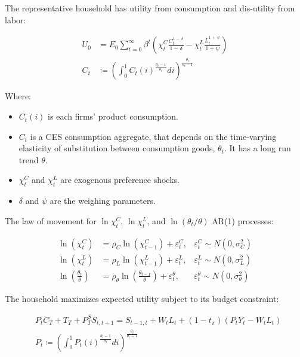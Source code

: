 \documentclass[12pt]{article}
\begin{document}
The representative household has utility from consumption and dis-utility from labor:

\begin{align*}
    U_{0} &=E_{0}\sum_{t=0}^{\infty}\beta^{t}\left(\chi_{t}^{C}\frac{C_{t}^{1\,-\,\delta}}{1-\delta}-\chi_{t}^{L}\frac{L_{t}^{1\,+\,\psi}}{1+\psi}\right)\\
    C_t &\coloneqq \left(\int_0^1C_t(i)^{\frac{\theta_t - 1}{\theta_t}} di\right)^{\frac{\theta_t}{\theta_t - 1}}
\end{align*}

Where:

\begin{itemize}
    \item $C_t(i)$ is each firms' product consumption.
    \item $C_t$ is a CES consumption aggregate, that depends on the time-varying elasticity of substitution between consumption goods, $\theta_t$. It has a long run trend $\theta$.
    \item $\chi_t^C$ and $\chi_t^L$ are exogenous preference shocks.
    \item $\delta$ and $\psi$ are the weighing parameters.
\end{itemize}

The law of movement for $\ln\chi_t^C$, $\ln\chi_t^L$, and $\ln(\theta_t/\theta)$ AR(1) processes:

\begin{align*}
    \ln(\chi_{t}^{C}) &=\rho_{C}\ln(\chi_{t-1}^{C})+\varepsilon_{t}^{C}, &\varepsilon_{t}^{C} \sim N(0, \sigma^2_C) \tag{1}\\
    \ln(\chi_{t}^{L}) &=\rho_{L}\ln(\chi_{t-1}^{L})+\varepsilon_{t}^{L}, &\varepsilon_{t}^{L} \sim N(0, \sigma^2_L) \tag{2}\\
    \ln\left(\frac{\theta_t}{\theta}\right) &= \rho_\theta \ln\left(\frac{\theta_{t-1}}{\theta}\right) + \varepsilon^\theta_t, &\varepsilon_{t}^{\theta} \sim N(0, \sigma^2_\theta) \tag{10}
\end{align*}

The household maximizes expected utility subject to its budget constraint:

\begin{align*}
    &P_tC_T + T_T + P^S_TS_{t,t+1} = S_{t-1,t} + W_tL_t + (1-t_\pi)(P_tY_t - W_tL_t) \tag{3}\\
    &P_t \coloneqq \left(\int_0^1P_t(i)^{\frac{\theta_t - 1}{\theta_t}} di\right)^{\frac{\theta_t}{\theta_t - 1}}
\end{align*}
\end{document}
